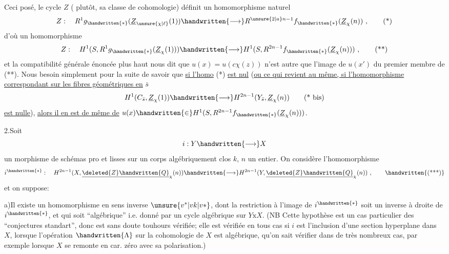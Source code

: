 Ceci posé, le cycle $Z$ ( plutôt, sa classe de cohomologie) définit un homomorphisme naturel
\[
Z:\quad R^1g_{\handwritten{*}}(\underline{Z}_{\unsure{\chi|\ell}}(1))\handwritten{\longrightarrow}R^{\unsure{2|a}n-1}f_{\handwritten{*}}(\underline{Z}_{\chi}(n))\ ,\tag*{(*)}
\]
d'où un homomorphisme
\[
Z:\quad H^1(S,R^1g_{\handwritten{*}}(\underline{Z}_{\chi}(1)))\handwritten{\longrightarrow}H^1(S,R^{2n-1}f_{\handwritten{*}}(\underline{Z}_{\chi}(n)))\ ,\tag*{(**)}
\]
et la compatibilité générale énoncée plus haut nous dit que $u(x)=u(c\chi(z))$ n'est autre que l'image de $u(x')$ du premier membre de  (**). Nous  besoin simplement pour la suite de savoir que \uline{si l'homo} (*) \uline{est nul} (\uline{ou ce qui revient au même, si l'homomorphisme correspondant sur les fibres géométriques en} $\bar s$ 
\[
H^1(C_{\bar s},\underline{Z}_{\chi}(1))\handwritten{\longrightarrow}H^{2n-1}(Y_{\bar s},\underline{Z}_{\chi}(n))\tag*{(* bis)}
\]
\uline{est nulle}), \uline{alors il en est de même de} $u(x)\handwritten{\in}H^1(S,R^{2n-1}f_{\handwritten{*}}(\underline{Z}_{\chi}(n)))$.

2.\quad Soit
\[
i:Y\handwritten{\longrightarrow}X
\]
un morphisme de schémas pro et lisses sur un corps algébriquement clos $k$, $n$ un entier. On  considère l'homomorphisme
\[
i^{\handwritten{*}}:\quad H^{2n-1}(X,\underline{\deleted{Z}\handwritten{Q}}_{\chi}(n))\handwritten{\longrightarrow}H^{2n-1}(Y,\underline{\deleted{Z}\handwritten{Q}}_{\chi}(n))\ ,\tag*{\handwritten{(***)}}
\]
et on suppose:

a)\quad Il existe un homomorphisme en sens inverse $\unsure{v^*|vk|v*}$, dont la restriction à l'image de $i^{\handwritten{*}}$ soit un inverse à droite de $i^{\handwritten{*}}$, et qui soit ``algébrique'' i.e. donné par un cycle algébrique sur $Y\mathbin{\mathrm{x}}X$. (NB Cette hypothèse est un cas particulier des ``conjectures standart'', donc est sans doute touhours vérifiée; elle est vérifiée en tous cas si $i$ est l'inclusion d'une section hyperplane dans $X$, lorsque l'opération $\handwritten{\Lambda}$ sur  la cohomologie de $X$ est algébrique,   qu'on sait vérifier dans de très nombreux cas, par exemple lorsque $X$ se remonte en car. zéro avec sa polarisation.)
